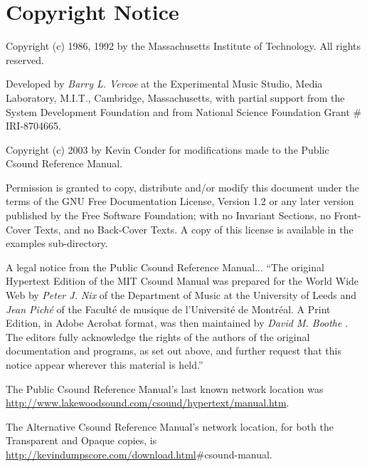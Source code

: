 \begin{comment}
\documentclass[10pt]{article}
\usepackage{fullpage, graphicx, url}
\setlength{\parskip}{1ex}
\setlength{\parindent}{0ex}
\title{Copyright Notice}



\begin{tabular}{ccc}
The Alternative Csound Reference Manual & & \\
Previous &Preface &Next

\end{tabular}

\end{comment}
\section{Copyright Notice}


  Copyright (c) 1986, 1992 by the Massachusetts Institute of Technology. All rights reserved. 


  Developed by \emph{Barry L. Vercoe}
 at the Experimental Music Studio, Media Laboratory, M.I.T., Cambridge, Massachusetts, with partial support from the System Development Foundation and from National Science Foundation Grant \# IRI-8704665. 


  Copyright (c) 2003 by Kevin Conder for modifications made to the Public Csound Reference Manual. 


  Permission is granted to copy, distribute and/or modify this document under the terms of the GNU Free Documentation License, Version 1.2 or any later version published by the Free Software Foundation; with no Invariant Sections, no Front-Cover Texts, and no Back-Cover Texts. A copy of this license is available in the examples sub-directory. 


  A legal notice from the Public Csound Reference Manual... ``The original Hypertext Edition of the MIT Csound Manual was prepared for the World Wide Web by \emph{Peter J. Nix}
 of the Department of Music at the University of Leeds and \emph{Jean Pich\'e}
 of the Facult\'e de musique de l'Universit\'e de Montr\'eal. A Print Edition, in Adobe Acrobat format, was then maintained by \emph{David M. Boothe}
. The editors fully acknowledge the rights of the authors of the original documentation and programs, as set out above, and further request that this notice appear wherever this material is held.''


  The Public Csound Reference Manual's last known network location was \url{http://www.lakewoodsound.com/csound/hypertext/manual.htm}. 


  The Alternative Csound Reference Manual's network location, for both the Transparent and Opaque copies, is \url{http://kevindumpscore.com/download.html}\#csound-manual. 


\begin{comment}
\begin{tabular}{lcr}
Previous &Home &Next \\
Preface &Up &Acknowledgements

\end{tabular}



\end{comment}
